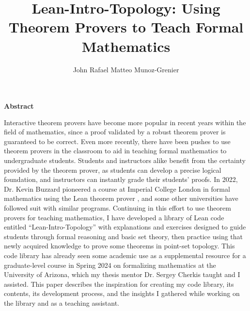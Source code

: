 \documentclass[11pt, oneside]{book}
\title{Lean-Intro-Topology: Using Theorem Provers to Teach Formal Mathematics}
\author{John Rafael Matteo Munoz-Grenier}
\begin{document}
\frontmatter
\newpage
{
  \vfill
  \LARGE 
  \textbf{Abstract}
  \normalsize

  Interactive theorem provers have become more popular in recent
  years within the field of mathematics, since a proof validated
  by a robust theorem prover is guaranteed to be correct. Even more
  recently, there have been pushes to use theorem provers in the
  classroom to aid in teaching formal mathematics to undergraduate 
  students. Students and instructors alike benefit from the certainty
  provided by the theorem prover, as students can develop a precise
  logical foundation, and instructors can instantly grade their students'
  proofs. In 2022, Dr. Kevin Buzzard pioneered a course at 
  Imperial College London in formal mathematics
  using the Lean theorem prover \cite{Buzzard}, and some
  other universities have followed suit with similar programs.
  Continuing in this effort to use theorem provers for teaching mathematics,
  I have developed a library of Lean code entitled ``Lean-Intro-Topology''
  with explanations and exercises designed to guide students through 
  formal reasoning and basic set theory, then practice using that newly
  acquired knowledge to prove some theorems in point-set topology.
  This code library has already seen some academic use as a supplemental
  resource for a graduate-level course in Spring 2024
  on formalizing mathematics at the University of Arizona, which my 
  thesis mentor Dr. Sergey Cherkis taught and I assisted. 
  This paper describes the inspiration for creating my code library, 
  its contents, its development process, and the insights I gathered
  while working on the library and as a teaching assistant.

  \vfill
}
\tableofcontents

\mainmatter





\end{document}
